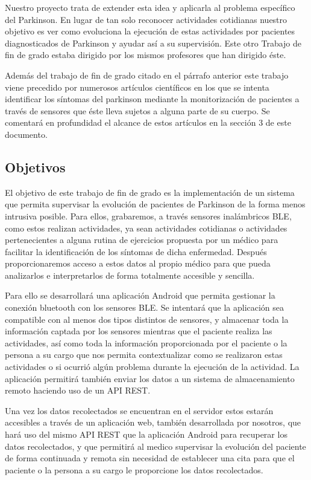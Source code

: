 \documentclass[11pt,spanish]{article}
\begin{document}
Nuestro proyecto trata de extender esta idea y aplicarla al problema específico del Parkinson. En lugar de tan solo reconocer actividades cotidianas nuestro objetivo es ver como evoluciona la ejecución de estas actividades por pacientes diagnosticados de Parkinson y ayudar así a su supervisión. Este otro Trabajo de fin de grado estaba dirigido por los mismos profesores que han dirigido éste.
\newline

Además del trabajo de fin de grado citado en el párrafo anterior este trabajo viene precedido por numerosos artículos científicos en los que se intenta identificar los síntomas del parkinson mediante la monitorización de pacientes a través de sensores que éste lleva sujetos a alguna parte de su cuerpo. Se comentará en profundidad el alcance de estos artículos en la sección 3 de este documento.

\subsection{Objetivos}

El objetivo de este trabajo de fin de grado es la implementación de un sistema que permita supervisar la evolución de pacientes de Parkinson de la forma menos intrusiva posible. Para ellos, grabaremos, a través sensores inalámbricos BLE, como estos realizan actividades, ya sean actividades cotidianas o actividades pertenecientes a alguna rutina de ejercicios propuesta por un médico para facilitar la identificación de los síntomas de dicha enfermedad. Después proporcionaremos acceso a estos datos al propio médico para que pueda analizarlos e interpretarlos de forma totalmente accesible y sencilla. 
\newline

Para ello se desarrollará una aplicación Android que permita gestionar la conexión bluetooth con los sensores BLE. Se intentará que la aplicación sea compatible con al menos dos tipos distintos de sensores, y almacenar toda la información captada por los sensores mientras que el paciente realiza las actividades, así como toda la información proporcionada por el paciente o la persona a su cargo que nos permita contextualizar como se realizaron estas actividades o si ocurrió algún problema durante la ejecución de la actividad. La aplicación permitirá también enviar los datos a un sistema de almacenamiento remoto haciendo uso de un API REST. 
\newline

Una vez los datos recolectados se encuentran en el servidor estos estarán accesibles a través de un aplicación web, también desarrollada por nosotros, que hará uso del mismo API REST que la aplicación Android para recuperar los datos recolectados, y que permitirá al medico supervisar la evolución del paciente de forma continuada y remota sin necesidad de establecer una cita para que el paciente o la persona a su cargo le proporcione los datos recolectados. 
\newline
\end{document}
